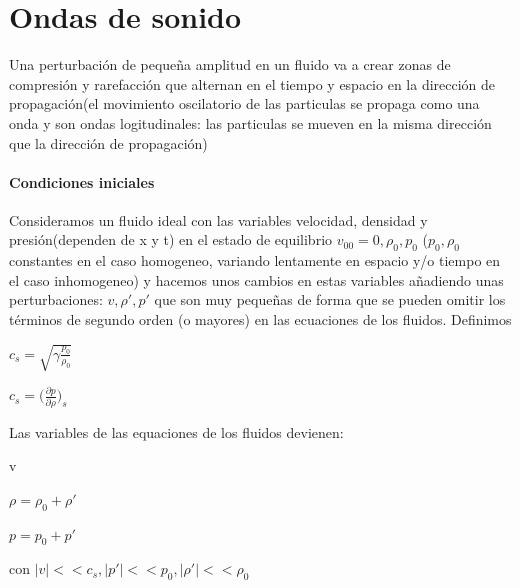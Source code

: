 \documentclass{article}
\begin{document}
\section{Ondas de sonido}
Una perturbación de pequeña amplitud en un fluido va a crear zonas de compresión y rarefacción que alternan en el tiempo y espacio en la dirección de propagación(el movimiento oscilatorio de las particulas se propaga como una onda y son ondas logitudinales:  las particulas se mueven en la misma dirección que la dirección de propagación)

\paragraph{Condiciones iniciales}
Consideramos un fluido ideal con las variables velocidad, densidad y presión(dependen de x y t) en el estado de equilibrio 
$v_{00} = 0, \rho_0 , p_0$ ($p_0, \rho_0$ constantes en el caso homogeneo, variando lentamente en espacio y/o tiempo en el caso inhomogeneo)
 y hacemos unos cambios en estas variables añadiendo unas perturbaciones:
$ v, \rho\prime, p\prime $ 
que  son muy pequeñas de forma que se pueden omitir los términos de segundo orden (o mayores) en las ecuaciones de los fluidos.
Definimos 
\begin{description}  
 \item $c_s = \sqrt{\gamma \frac{p_0}{\rho_0}}$

 \item $c_s  =\big( \frac{\partial p}{\partial \rho}\big)_s  $

\end{description}  

Las variables de las equaciones de los fluidos devienen:

\begin{description}  
\item v
\item $\rho = \rho_0 + \rho\prime$
\item $p = p_0 + p\prime$

 
\end{description}  

con $|v|<<c_s, |p\prime|<<p_0 , |\rho\prime| << \rho_0$ 
\end{document}
